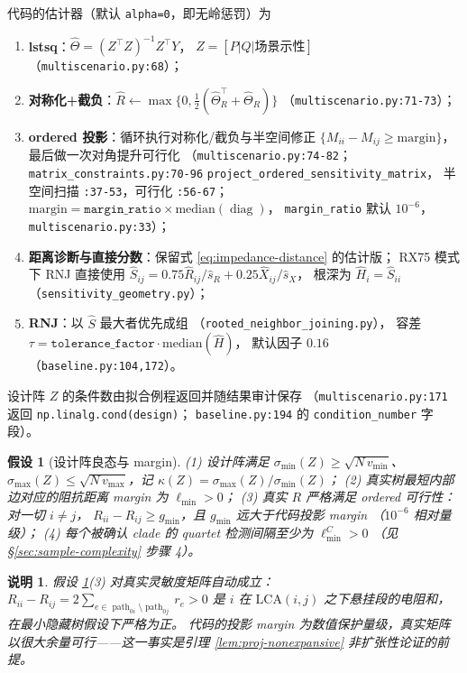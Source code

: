 \documentclass[UTF8,11pt]{ctexart}
\newtheorem{assumption}{假设}
\newtheorem{remark}{说明}
\begin{document}
代码的估计器（默认 \texttt{alpha=0}，即无岭惩罚）为
\begin{enumerate}[leftmargin=2em]
  \item \textbf{lstsq}：$\widehat\Theta=(Z^\top Z)^{-1}Z^\top Y$，
        $Z=[P|Q|\text{场景示性}]$（\texttt{multiscenario.py:68}）；
  \item \textbf{对称化+截负}：$\widehat R\leftarrow \max\{0,\tfrac12(\widehat\Theta_R^\top+\widehat\Theta_R)\}$
        （\texttt{multiscenario.py:71-73}）；
  \item \textbf{ordered 投影}：循环执行对称化/截负与半空间修正
        $\{M_{ii}-M_{ij}\ge \mathrm{margin}\}$，最后做一次对角提升可行化
        （\texttt{multiscenario.py:74-82}；
        \texttt{matrix\_constraints.py:70-96} \texttt{project\_ordered\_sensitivity\_matrix}，
        半空间扫描 \texttt{:37-53}，可行化 \texttt{:56-67}；
        $\mathrm{margin}=\texttt{margin\_ratio}\times\mathrm{median}(\operatorname{diag})$，
        \texttt{margin\_ratio} 默认 $10^{-6}$，\texttt{multiscenario.py:33}）；
  \item \textbf{距离诊断与直接分数}：保留式 \eqref{eq:impedance-distance} 的估计版；
        RX75 模式下 RNJ 直接使用
        $\hat S_{ij}=0.75\widehat R_{ij}/\hat s_R+0.25\widehat X_{ij}/\hat s_X$，
        根深为 $\hat H_i=\hat S_{ii}$（\texttt{sensitivity\_geometry.py}）；
  \item \textbf{RNJ}：以 $\hat S$ 最大者优先成组
        （\texttt{rooted\_neighbor\_joining.py}），
        容差 $\tau=\texttt{tolerance\_factor}\cdot\mathrm{median}(\hat H)$，
        默认因子 $0.16$（\texttt{baseline.py:104,172}）。
\end{enumerate}
设计阵 $Z$ 的条件数由拟合例程返回并随结果审计保存
（\texttt{multiscenario.py:171} 返回 \texttt{np.linalg.cond(design)}；
\texttt{baseline.py:194} 的 \texttt{condition\_number} 字段）。

\begin{assumption}[设计阵良态与 margin]
\label{ass:design}
(1) 设计阵满足 $\sigma_{\min}(Z)\ge \sqrt{N\,v_{\min}}$、
$\sigma_{\max}(Z)\le \sqrt{N\,v_{\max}}$，记 $\kappa(Z)=\sigma_{\max}(Z)/\sigma_{\min}(Z)$；
(2) 真实树最短内部边对应的阻抗距离 margin 为 $\ell_{\min}>0$；
(3) 真实 $R$ 严格满足 ordered 可行性：对一切 $i\neq j$，
$R_{ii}-R_{ij}\ge g_{\min}$，且 $g_{\min}$ 远大于代码投影 margin
（$10^{-6}$ 相对量级）；
(4) 每个被确认 clade 的 quartet 检测间隔至少为 $\ell^C_{\min}>0$
（见 \S\ref{sec:sample-complexity} 步骤 4）。
\end{assumption}

\begin{remark}
假设 \ref{ass:design}(3) 对真实灵敏度矩阵自动成立：
$R_{ii}-R_{ij}=2\sum_{e\in \operatorname{path}_{0i}\setminus\operatorname{path}_{0j}} r_e>0$
是 $i$ 在 $\mathrm{LCA}(i,j)$ 之下悬挂段的电阻和，在最小隐藏树假设下严格为正。
代码的投影 margin 为数值保护量级，真实矩阵以很大余量可行——这一事实是引理
\ref{lem:proj-nonexpansive} 非扩张性论证的前提。
\end{remark}
\end{document}
